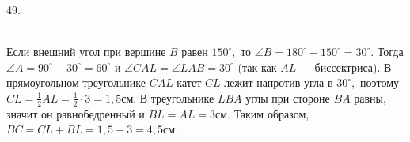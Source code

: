 49. \begin{figure}[ht!]
\end{figure}\\
Если внешний угол при вершине $B$ равен $150^\circ,$ то $\angle B=180^\circ-150^\circ=30^\circ.$ Тогда $\angle A=90^\circ-30^\circ=60^\circ$ и $\angle CAL=\angle LAB=30^\circ$ (так как $AL$ --- биссектриса). В прямоугольном треугольнике $CAL$ катет $CL$ лежит напротив угла в $30^\circ,$ поэтому $CL=\frac{1}{2}AL=\frac{1}{2}\cdot3=1,5$см. В треугольнике $LBA$ углы при стороне $BA$ равны, значит он равнобедренный и $BL=AL=3$см. Таким образом, $BC=CL+BL=1,5+3=4,5$см.\\
